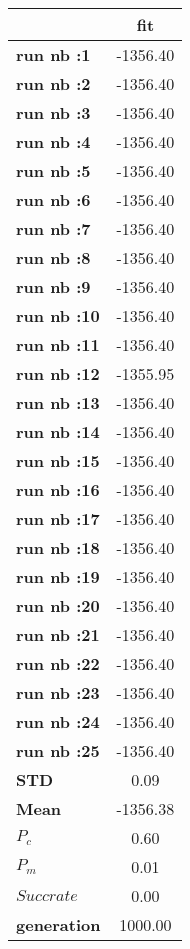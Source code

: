 \begin{tiny}\begin{tabular}{|l|c|}
\hline
&\textbf{fit}\\\hline
\textbf{run nb :1}&-1356.40\\\hline
\textbf{run nb :2}&-1356.40\\\hline
\textbf{run nb :3}&-1356.40\\\hline
\textbf{run nb :4}&-1356.40\\\hline
\textbf{run nb :5}&-1356.40\\\hline
\textbf{run nb :6}&-1356.40\\\hline
\textbf{run nb :7}&-1356.40\\\hline
\textbf{run nb :8}&-1356.40\\\hline
\textbf{run nb :9}&-1356.40\\\hline
\textbf{run nb :10}&-1356.40\\\hline
\textbf{run nb :11}&-1356.40\\\hline
\textbf{run nb :12}&-1355.95\\\hline
\textbf{run nb :13}&-1356.40\\\hline
\textbf{run nb :14}&-1356.40\\\hline
\textbf{run nb :15}&-1356.40\\\hline
\textbf{run nb :16}&-1356.40\\\hline
\textbf{run nb :17}&-1356.40\\\hline
\textbf{run nb :18}&-1356.40\\\hline
\textbf{run nb :19}&-1356.40\\\hline
\textbf{run nb :20}&-1356.40\\\hline
\textbf{run nb :21}&-1356.40\\\hline
\textbf{run nb :22}&-1356.40\\\hline
\textbf{run nb :23}&-1356.40\\\hline
\textbf{run nb :24}&-1356.40\\\hline
\textbf{run nb :25}&-1356.40\\\hline
\textbf{STD}&0.09\\\hline
\textbf{Mean}&-1356.38\\\hline
\textbf{$P_c$}&0.60\\\hline
\textbf{$P_{m}$}&0.01\\\hline
\textbf{$Succ rate$}&0.00\\\hline
\textbf{generation}&1000.00\\\hline
\end{tabular}
\end{tiny}